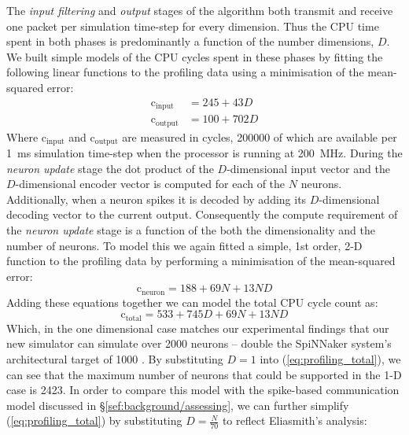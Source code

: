 \documentclass[conference]{IEEEtran}
\begin{document}
The \textit{input filtering} and \textit{output} stages of the algorithm both transmit and receive one packet per simulation time-step for every dimension.
Thus the CPU time spent in both phases is predominantly a function of the number dimensions, $D$.
We built simple models of the CPU cycles spent in these phases by fitting the following linear functions to the profiling data using a minimisation of the mean-squared error:
%
\begin{align}
  \mathrm{c}_\mathrm{input} & = 245 + 43 D \label{eq:profiling_input}\\
  \mathrm{c}_\mathrm{output} & = 100 + 702 D \label{eq:profiling_output}
\end{align}
%
Where $\mathrm{c}_\mathrm{input}$ and $\mathrm{c}_\mathrm{output}$ are measured in cycles, \num{200000} of which are available per \SI{1}{\milli\second} simulation time-step when the processor is running at \SI{200}{\mega\hertz}.
During the \textit{neuron update} stage the dot product of the $D$-dimensional input vector and the $D$-dimensional encoder vector is computed for each of the $N$ neurons.
Additionally, when a neuron spikes it is decoded by adding its $D$-dimensional decoding vector to the current output.
Consequently the compute requirement of the \textit{neuron update} stage is a function of the both the dimensionality and the number of neurons.
To model this we again fitted a simple, 1st order, 2-D function to the profiling data by performing a minimisation of the mean-squared error:
%
\begin{equation}
  \mathrm{c}_\mathrm{neuron} = 188 + 69 N + 13 N D\label{eq:profiling_neuron}
\end{equation}
%
Adding these equations together we can model the total CPU cycle count as:
%
\begin{equation}
  \mathrm{c}_\mathrm{total} = 533 + 745 D + 69 N + 13 N D\label{eq:profiling_total}
\end{equation}
%
Which, in the one dimensional case matches our experimental findings that our new simulator can simulate over 2000 neurons -- double the SpiNNaker system's architectural target of 1000 \parencite{Furber2007}. 
By substituting $D=1$ into (\ref{eq:profiling_total}), we can see that the maximum number of neurons that could be supported in the 1-D case is 2423.
In order to compare this model with the spike-based communication model discussed in \S\ref{sef:background/assessing}, we can further simplify (\ref{eq:profiling_total}) by substituting $D=\frac{N}{70}$ to reflect Eliasmith's \parencite{eliasmith2013build} analysis:
\end{document}
